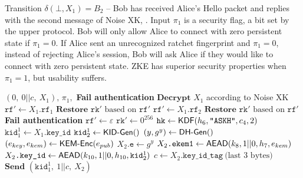 \documentclass{article}
\begin{document}
\begin{algorithm}
	\caption{Transition $\delta(\bot, X_1)=B_2$ -- Bob has received Alice's Hello packet and replies with the second message of Noise XK, . Input $\pi_1$ is a security flag, a bit set by the upper protocol. Bob will only allow Alice to connect with zero persistent state if $\pi_1=0$. If Alice sent an unrecognized ratchet fingerprint and $\pi_1=0$, instead of rejecting Alice's session, Bob will ask Alice if they would like to connect with zero persistent state. ZKE has superior security properties when $\pi_1=1$, but usability suffers.}\label{alg:recv_x1}
	\begin{algorithmic}
		\Require $(0,\ 0||c,\ X_1),\, \pi_1,$
			\State \textbf{Fail authentication}
		\EndIf
		\State $\textbf{Decrypt } X_1$ according to Noise XK
		\State $\texttt{rf}' \gets X_1\texttt{.rf}_1$
		\State $\textbf{Restore } \texttt{rk}' \text{ based on } \texttt{rf}'$
			\State $\texttt{rf}' \gets X_1\texttt{.rf}_2$
			\State $\textbf{Restore } \texttt{rk}' \text{ based on } \texttt{rf}'$
					\State \textbf{Fail authentication}
				\Else
					\State $\texttt{rf}' \gets \varepsilon$
					\State $\texttt{rk}' \gets 0^{256}$
				\EndIf
			\EndIf
		\EndIf
		\State $\texttt{hk} \gets \text{\sf KDF}(h_6, \texttt{"ASKH"}, c_4, 2)$
		\State $\texttt{kid}^1_1 \gets X_1\texttt{.key\_id}$
		\State $\texttt{kid}^1_2 \gets \text{\sf KID-Gen}()$
		\State $(y, g^y) \gets \text{\sf DH-Gen}()$
		\State $(e_{key}, e_{kem}) \gets \text{\sf KEM-Enc}(e_{pub})$
		\State $X_2\texttt{.e} \gets g^y$
		\State $X_2\texttt{.ekem1} \gets \text{\sf AEAD}(k_8, 1||0, h_7, e_{kem})$
		\State $X_2\texttt{.key\_id} \gets \text{\sf AEAD}(k_{10}, 1||0, h_{10}, \texttt{kid}^1_2)$
		\State $c \gets X_2\texttt{.key\_id\_tag}\ \text{(last 3 bytes)}$
		\State $\textbf{Send } (\texttt{kid}^1_1,\ 1||c,\ X_2)$
	\end{algorithmic}
\end{algorithm}
\end{document}
